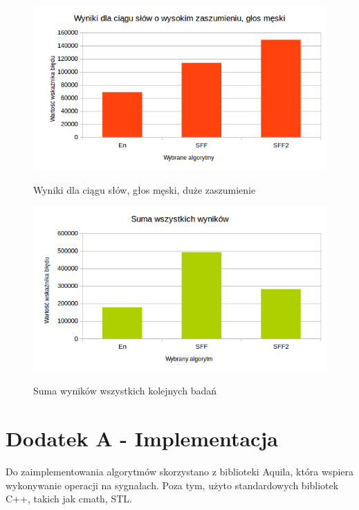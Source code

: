 \documentclass[eng,printmode]{mgr}
\begin{document}
\begin{figure}
	\begin{center}
		{\includegraphics[scale=1]{noisedmwr35w1s14results.png}}
		\caption{Wyniki dla ciągu słów, głos męski, duże zaszumienie}\vspace{5mm}
	\end{center}
\end{figure}


\begin{figure}
	\begin{center}
		{\includegraphics[scale=1]{sumOfResults.png}}
		\caption{Suma wyników wszystkich kolejnych badań}\vspace{5mm}
	\end{center}
\end{figure}

\chapter{Dodatek A - Implementacja}
Do zaimplementowania algorytmów skorzystano z biblioteki Aquila, która wspiera wykonywanie operacji na sygnałach. Poza tym, użyto standardowych bibliotek C++, takich jak cmath, STL.
\end{document}
